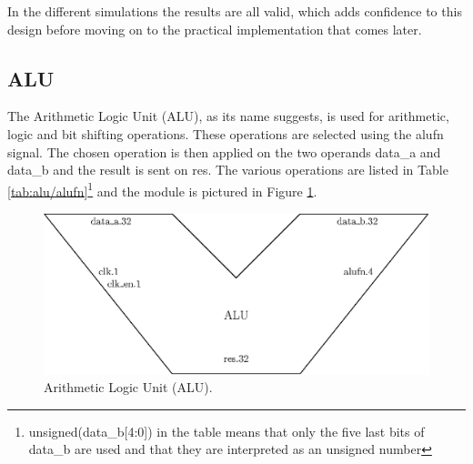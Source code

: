 In the different simulations the results are all valid, which adds confidence to this design before 
moving on to the practical implementation that comes later.

\subsection{ALU}

The Arithmetic Logic Unit (ALU), as its name suggests, is used for arithmetic, logic and bit shifting 
operations. These operations are selected using the alufn signal. The chosen operation is then 
applied on the two operands data\_a and data\_b and the result is sent on res. The various
operations are listed in Table \ref{tab:alu/alufn}\footnote{unsigned(data\_b[4:0]) in the table means 
that only the five last bits of data\_b are used and that they are interpreted as an unsigned number
} and the module is pictured in Figure \ref{fig:components/alu}. 

\begin{figure}[ht]
    \centering
    \includegraphics[scale=0.8]{Chapter3-CPU/res/alu}
    \caption{Arithmetic Logic Unit (ALU).}
    \label{fig:components/alu}
\end{figure}

